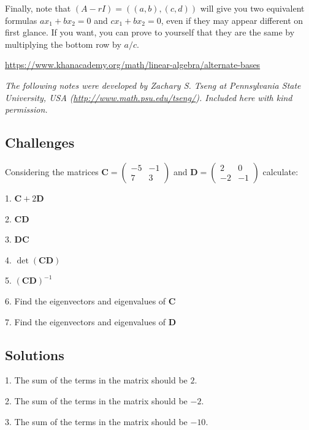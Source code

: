 Finally, note that $(A-rI) = ((a, b), (c, d))$ will give you two equivalent formulas $a x_1 + b x_2 = 0$ and $c x_1 + b x_2 = 0$, even if they may appear different on first glance. If you want, you can prove to yourself that they are the same by multiplying the bottom row by $a/c$.

\vspace{0.2cm}
\noindent [1] \url{https://www.khanacademy.org/math/linear-algebra/alternate-bases}

\emph{The following notes were developed by Zachary S. Tseng at Pennsylvania State University, USA (\url{http://www.math.psu.edu/tseng/}). Included here with kind permission.}



\subsection*{Challenges}
Considering the matrices
$\displaystyle
    \mathbf{C} =
\left(
    \begin{array}{cc}
        -5 & -1 \\
        7 & 3
    \end{array}
\right)
$
and
$\displaystyle
    \mathbf{D} =
\left(
    \begin{array}{cc}
        2 & 0 \\
        -2 & -1
    \end{array}
\right)
$
calculate:

1. $\mathbf{C} + 2 \mathbf{D}$

2. $\mathbf{C} \mathbf{D}$

3. $\mathbf{D} \mathbf{C}$

4. $\det(\mathbf{CD})$

5. $\mathbf{(CD)}^{-1}$

6. Find the eigenvectors and eigenvalues of $\mathbf{C}$

7. Find the eigenvectors and eigenvalues of $\mathbf{D}$

\subsection*{Solutions}
1. The sum of the terms in the matrix should be $2$.

2. The sum of the terms in the matrix should be $-2$.

3. The sum of the terms in the matrix should be $-10$.

